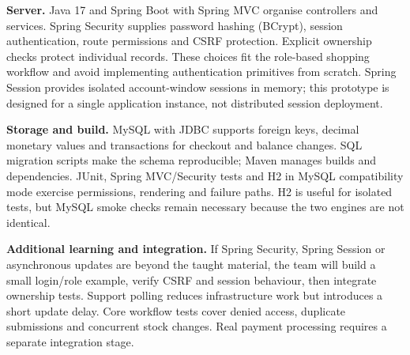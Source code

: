 \textbf{Server.} Java 17 and Spring Boot with Spring MVC organise controllers and services. Spring Security supplies password hashing (BCrypt), session authentication, route permissions and CSRF protection. Explicit ownership checks protect individual records. These choices fit the role-based shopping workflow and avoid implementing authentication primitives from scratch. Spring Session provides isolated account-window sessions in memory; this prototype is designed for a single application instance, not distributed session deployment.

\textbf{Storage and build.} MySQL with JDBC supports foreign keys, decimal monetary values and transactions for checkout and balance changes. SQL migration scripts make the schema reproducible; Maven manages builds and dependencies. JUnit, Spring MVC/Security tests and H2 in MySQL compatibility mode exercise permissions, rendering and failure paths. H2 is useful for isolated tests, but MySQL smoke checks remain necessary because the two engines are not identical.

\textbf{Additional learning and integration.} If Spring Security, Spring Session or asynchronous updates are beyond the taught material, the team will build a small login/role example, verify CSRF and session behaviour, then integrate ownership tests. Support polling reduces infrastructure work but introduces a short update delay. Core workflow tests cover denied access, duplicate submissions and concurrent stock changes. Real payment processing requires a separate integration stage.

